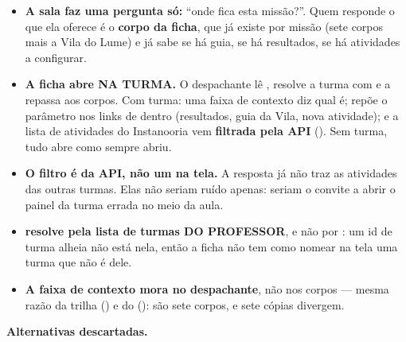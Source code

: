 \begin{itemize}
  \item \textbf{A sala faz uma pergunta só:} \enquote{onde fica esta missão?}.
    Quem responde o que ela oferece é o \textbf{corpo da ficha}, que já existe
    por missão (sete corpos mais a Vila do Lume) e já sabe se há guia, se há
    resultados, se há atividades a configurar.
  \item \textbf{A ficha abre NA TURMA.} O despachante lê ,
    resolve a turma com  e a repassa aos corpos. Com turma:
    uma faixa de contexto diz qual é;  repõe o parâmetro nos
    links de dentro (resultados, guia da Vila, nova atividade); e a lista de
    atividades do Instanooria vem \textbf{filtrada pela API}
    (). Sem turma, tudo abre como sempre abriu.
  \item \textbf{O filtro é da API, não um  na tela.} A resposta já não
    traz as atividades das outras turmas. Elas não seriam ruído apenas: seriam o
    convite a abrir o painel da turma errada no meio da aula.
  \item \textbf{ resolve pela lista de turmas DO
    PROFESSOR}, e não por : um id de turma alheia não está
    nela, então a ficha não tem como nomear na tela uma turma que não é dele.
  \item \textbf{A faixa de contexto mora no despachante}, não nos corpos ---
    mesma razão da trilha () e do 
    (): são sete corpos, e sete cópias divergem.
\end{itemize}

\textbf{Alternativas descartadas.}


